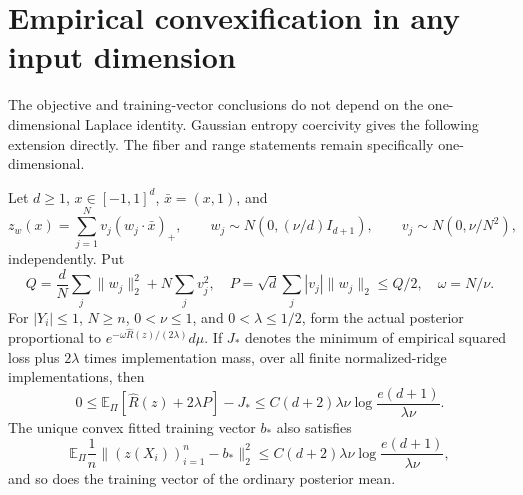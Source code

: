 \section{Empirical convexification in any input dimension}
The objective and training-vector conclusions do not depend on the
one-dimensional Laplace identity. Gaussian entropy coercivity gives
the following extension directly. The fiber and range statements
remain specifically one-dimensional.

\begin{proposition}
Let $d\ge1$, $x\in[-1,1]^d$, $\bar x=(x,1)$, and
\[
 z_w(x)=\sum_{j=1}^N v_j(w_j\cdot\bar x)_+,
 \qquad w_j\sim N(0,(\nu/d)I_{d+1}),\qquad
 v_j\sim N(0,\nu/N^2),
\]
independently. Put
\[
 Q=\frac dN\sum_j\|w_j\|_2^2+N\sum_jv_j^2,
 \quad P=\sqrt d\sum_j|v_j|\|w_j\|_2\le Q/2,
 \quad\omega=N/\nu.
\]
For $|Y_i|\le1$, $N\ge n$, $0<\nu\le1$, and $0<\lambda\le1/2$,
form the actual posterior proportional to
$e^{-\omega\widehat R(z)/(2\lambda)}d\mu$.
If $J_*$ denotes the minimum of empirical squared loss plus
$2\lambda$ times implementation mass, over all finite normalized-ridge
implementations, then
\[
 0\le\mathbb E_\Pi[\widehat R(z)+2\lambda P]-J_*
 \le C(d+2)\lambda\nu
          \log\frac{e(d+1)}{\lambda\nu}. \tag{GD1}
\]
The unique convex fitted training vector $b_*$ also satisfies
\[
 \mathbb E_\Pi\frac1n\|(z(X_i))_{i=1}^n-b_*\|_2^2
 \le C(d+2)\lambda\nu
          \log\frac{e(d+1)}{\lambda\nu}, \tag{GD2}
\]
and so does the training vector of the ordinary posterior mean.
\end{proposition}
